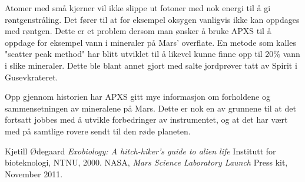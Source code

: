 Atomer med små kjerner vil ikke slippe ut fotoner med nok energi til å gi røntgenstråling.
Det fører til at for eksempel oksygen vanligvis ikke kan oppdages med røntgen.
Dette er et problem dersom man ønsker å bruke APXS til å oppdage for eksempel vann i mineraler på Mars' overflate.
En metode som kalles "scatter peak method" har blitt utviklet til å likevel kunne finne opp til 20\% vann i slike mineraler.
Dette ble blant annet gjort med salte jordprøver tatt av Spirit i Gusevkrateret.

Opp gjennom historien har APXS gitt mye informasjon om forholdene og sammensetningen av mineralene på Mars.
Dette er nok en av grunnene til at det fortsatt jobbes med å utvikle forbedringer av instrumentet, og at det har vært med på samtlige rovere sendt til den røde planeten.



	Kjetill Ødegaard
	\emph{Exobiology: A hitch-hiker's guide to alien life}
	Institutt for bioteknologi,
	NTNU,
	2000.
	NASA,
	\emph{Mars Science Laboratory Launch}
	Press kit,
	November 2011.